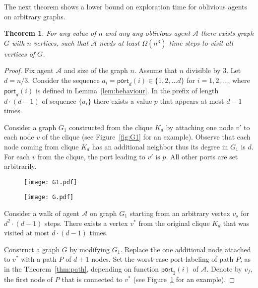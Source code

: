 \documentclass{article}[11pt,letter]
\newtheorem{theorem}[definition]{Theorem}
\newtheorem{theorem}[definition]{Theorem}
\newcommand{\agent}{\ensuremath{\mathcal{A}}\xspace}
\newcommand{\port}{\ensuremath{\mathsf{port}}}
\begin{document}
The next theorem shows a lower bound on exploration time for oblivious agents on arbitrary graphs.
\begin{theorem}
\label{thm:lower_general}
For any value of $n$ and any any oblivious agent $\agent$ there exists graph $G$ with $n$ vertices, such that $\agent$ needs at least $\Omega(n^3)$ time steps to visit all vertices of $G$.
\end{theorem}
\begin{proof}
Fix agent $\agent$ and size of the graph $n$. Assume that $n$ divisible by $3$. 
Let $d = n/3$. Consider the sequence $a_i = \port_{d}(i) \in \{1,2,\dots d\}$ for $i=1,2,\dots$, where $\port_{d}(i)$ is defined in Lemma~\ref{lem:behaviour}. In the prefix of length $d \cdot (d-1) $ of sequence $\{a_i\}$ there exists a value $p$ that appears at most $d-1$ times. 

Consider a graph $G_1$ constructed from the clique $K_{d}$ by attaching one node $v'$ to each node $v$ of the clique (see Figure~\ref{fig:G1} for an example). Observe that each node coming from clique $K_{d}$ has an additional neighbor thus its degree in $G_1$ is $d$. For each $v$ from the clique, the port leading to $v'$ is $p$. All other ports are set arbitrarily.

\begin{figure}[ht]
\centering
\begin{minipage}{.5\textwidth}
  \centering
  \texttt{[image: G1.pdf]}
  \label{fig:G1}
\end{minipage}\begin{minipage}{.5\textwidth}
  \centering
  \texttt{[image: G.pdf]}
  \label{fig:G}
\end{minipage}
\end{figure}

Consider a walk of agent $\agent$ on graph $G_1$ starting from an arbitrary vertex $v_s$ for $d^2 \cdot (d-1)$ steps. There exists a vertex $v^*$ from the original clique $K_{d}$ that was visited at most $d \cdot (d-1)$ times. 

Construct a graph $G$ by modifying $G_1$. Replace the one additional node attached to $v^*$ with a path $P$ of $d+1$ nodes. Set the worst-case port-labeling of path $P$, as in the Theorem~\ref{thm:path}, depending on function $\port_2(i)$ of $\agent$. Denote by $v_f$, the first node of $P$ that is connected to $v^*$ (see Figure~\ref{fig:G} for an example).



\end{proof}
\end{document}
